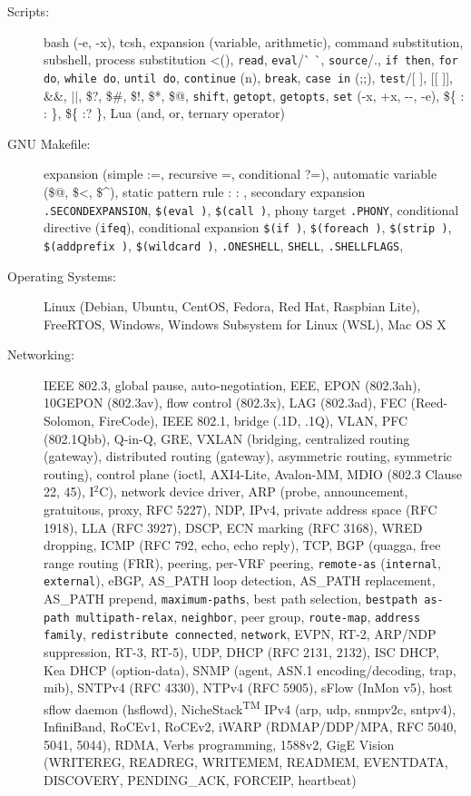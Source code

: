 \documentclass[letterpaper,11pt]{article}
\begin{document}
\begin{CJK}{UTF8}{gbsn}
\begin{description}
\item[Scripts:] bash (-e, -x), tcsh, expansion (variable, arithmetic), command substitution, subshell, process substitution \textless(), {\tt read},
{\tt eval}/\`{} \`{}, {\tt source}/.,
{\tt if then}, {\tt for do}, {\tt while do}, {\tt until do}, {\tt continue} (n), {\tt break}, {\tt case in} (;;), {\tt test}/[ ], [[ ]], \&\&, $||$, \$?, \$\#, \$!, \$*, \$@,
{\tt shift}, {\tt getopt}, {\tt getopts},
{\tt set} (-x, +x, -{}-, -e),
\$\{ : : \}, \$\{ :? \},
Lua (and, or, ternary operator)

\item[GNU Makefile:] expansion (simple :=, recursive =, conditional ?=), automatic variable (\$@, \$\textless, \$\^{}),
static pattern rule : : , secondary expansion {\tt .SECONDEXPANSION},
{\tt \$(eval )}, {\tt \$(call )},
phony target {\tt .PHONY},
conditional directive ({\tt ifeq}), conditional expansion {\tt \$(if )}, {\tt \$(foreach )}, {\tt \$(strip )}, {\tt \$(addprefix )},
{\tt \$(wildcard )},
{\tt .ONESHELL}, {\tt SHELL}, {\tt .SHELLFLAGS},


\item[Operating Systems:] Linux (Debian, Ubuntu, CentOS, Fedora, Red Hat, Raspbian Lite), FreeRTOS, Windows, Windows Subsystem for Linux (WSL), Mac OS X

\item[Networking:] IEEE 802.3, global pause, auto-negotiation, EEE, EPON (802.3ah), 10GEPON (802.3av), flow control (802.3x), LAG (802.3ad),
FEC (Reed-Solomon, FireCode),
IEEE 802.1, bridge (.1D, .1Q), VLAN, PFC (802.1Qbb), Q-in-Q, GRE, VXLAN (bridging, centralized routing (gateway),
distributed routing (gateway), asymmetric routing, symmetric routing),
control plane (ioctl, AXI4-Lite, Avalon-MM, MDIO (802.3 Clause 22, 45), I$^2$C),
network device driver, ARP (probe, announcement, gratuitous, proxy, RFC 5227), NDP, IPv4, private address space (RFC 1918), LLA (RFC 3927),
DSCP, ECN marking (RFC 3168), WRED dropping,
ICMP (RFC 792, echo, echo reply),
TCP, BGP (quagga, free range routing (FRR), peering, per-VRF peering, {\tt remote-as} ({\tt internal}, {\tt external}), eBGP,
AS\_PATH loop detection, AS\_PATH replacement, AS\_PATH prepend,
{\tt maximum-paths}, best path selection,
{\tt bestpath as-path multipath-relax}, {\tt neighbor}, peer group, {\tt route-map},
{\tt address family},
{\tt redistribute connected}, {\tt network}, EVPN, RT-2, ARP/NDP suppression, RT-3, RT-5),
UDP, DHCP (RFC 2131, 2132), ISC DHCP, Kea DHCP (option-data), SNMP (agent, ASN.1 encoding/decoding, trap, mib), SNTPv4 (RFC 4330), NTPv4 (RFC 5905),
sFlow (InMon v5), host sflow daemon (hsflowd),
%
NicheStack\textsuperscript{TM} IPv4 (arp, udp, snmpv2c, sntpv4),
%
InfiniBand, RoCEv1, RoCEv2,
iWARP (RDMAP/DDP/MPA, RFC 5040, 5041, 5044), RDMA, Verbs programming,
%
1588v2,
GigE Vision (WRITEREG, READREG, WRITEMEM, READMEM, EVENTDATA, DISCOVERY, PENDING\_ACK, FORCEIP, heartbeat)


\end{description}
\end{CJK}
\end{document}
